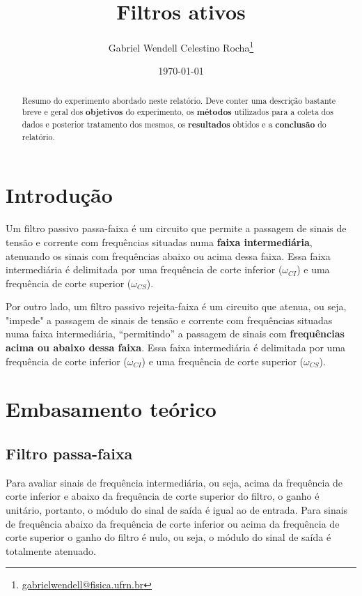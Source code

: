 \documentclass[letterpaper, 12pt]{article}
\begin{document}
\title{\bf Filtros ativos}
\author{Gabriel Wendell Celestino Rocha\footnote{\href{mailto:gabrielwendell@fisica.ufrn.br}{gabrielwendell@fisica.ufrn.br}}}
\date{\today}
\maketitle

\begin{abstract}
Resumo do experimento abordado neste relatório. Deve conter uma descrição bastante breve e geral dos \textbf{objetivos} do experimento, os \textbf{métodos} utilizados para a coleta dos dados e posterior tratamento dos mesmos, os \textbf{resultados} obtidos e a \textbf{conclusão} do relatório.
\end{abstract}



\section{Introdução}\label{Sec 1 - Introdução}
Um filtro passivo passa-faixa é um circuito que permite a passagem de sinais de tensão e corrente com frequências situadas numa \textbf{faixa intermediária}, atenuando os sinais com frequências abaixo ou acima dessa faixa. 
Essa faixa intermediária é delimitada por uma frequência de corte inferior ($\omega_{CI}$) e uma frequência de corte superior ($\omega_{CS}$).

Por outro lado, um filtro passivo rejeita-faixa é um circuito que atenua, ou seja, "impede" a passagem de sinais de tensão e corrente com frequências situadas numa faixa intermediária, “permitindo” a passagem de sinais com \textbf{frequências acima ou abaixo dessa faixa}. Essa faixa intermediária é delimitada por uma frequência de corte inferior ($\omega_{CI}$) e uma frequência de corte superior ($\omega_{CS}$). 




\section{Embasamento teórico}\label{Sec 2 - Teoria}
\subsection{Filtro passa-faixa}\label{SubSec - Passa-faixa}
Para avaliar sinais de frequência intermediária, ou seja, acima da frequência de corte inferior e abaixo da frequência de corte superior do filtro, o ganho é unitário, portanto, o módulo do sinal de saída é igual ao de entrada. Para sinais de frequência abaixo da frequência de corte inferior ou acima da frequência de corte superior o ganho do filtro é nulo, ou seja, o módulo do sinal de saída é totalmente atenuado.
\end{document}
